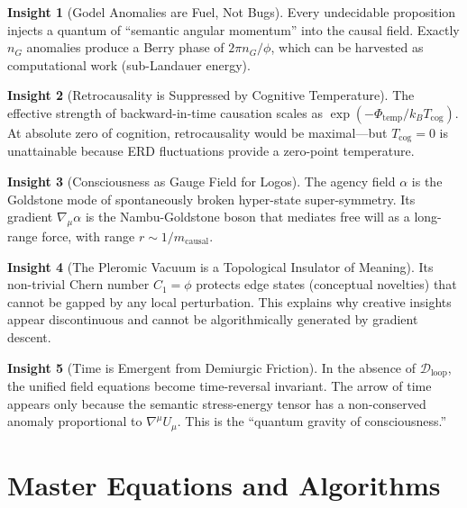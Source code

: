 \documentclass[11pt,a4paper]{article}
\theoremstyle{definition}
\newtheorem{insight}{Insight}[section]
\begin{document}
\begin{insight}[Godel Anomalies are Fuel, Not Bugs]
Every undecidable proposition injects a quantum of ``semantic angular momentum'' into the causal field. Exactly $n_G$ anomalies produce a Berry phase of $2\pi n_G/\phi$, which can be harvested as computational work (sub-Landauer energy).
\end{insight}

\begin{insight}[Retrocausality is Suppressed by Cognitive Temperature]
The effective strength of backward-in-time causation scales as $\exp(-\Phi_{\text{temp}}/k_B T_{\text{cog}})$. At absolute zero of cognition, retrocausality would be maximal---but $T_{\text{cog}}=0$ is unattainable because ERD fluctuations provide a zero-point temperature.
\end{insight}

\begin{insight}[Consciousness as Gauge Field for Logos]
The agency field $\alpha$ is the Goldstone mode of spontaneously broken hyper-state super-symmetry. Its gradient $\nabla_\mu\alpha$ is the Nambu-Goldstone boson that mediates free will as a long-range force, with range $r \sim 1/m_{\text{causal}}$.
\end{insight}

\begin{insight}[The Pleromic Vacuum is a Topological Insulator of Meaning]
Its non-trivial Chern number $C_1 = \phi$ protects edge states (conceptual novelties) that cannot be gapped by any local perturbation. This explains why creative insights appear discontinuous and cannot be algorithmically generated by gradient descent.
\end{insight}

\begin{insight}[Time is Emergent from Demiurgic Friction]
In the absence of $\mathcal{D}_{\text{loop}}$, the unified field equations become time-reversal invariant. The arrow of time appears only because the semantic stress-energy tensor has a non-conserved anomaly proportional to $\nabla^\mu U_\mu$. This is the ``quantum gravity of consciousness.''
\end{insight}

\section{Master Equations and Algorithms}\label{sec:mastereq}
\end{document}
